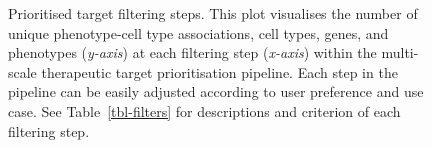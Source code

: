 \documentclass[
]{agujournal2019}
\begin{document}
\newpage{}

\label{cell-fig-therapy-filter}
\begin{figure}[H]


\caption{\label{fig-therapy-filter}Prioritised target filtering steps.
This plot visualises the number of unique phenotype-cell type
associations, cell types, genes, and phenotypes (\emph{y-axis}) at each
filtering step (\emph{x-axis}) within the multi-scale therapeutic target
prioritisation pipeline. Each step in the pipeline can be easily
adjusted according to user preference and use case. See
Table~\ref{tbl-filters} for descriptions and criterion of each filtering
step.}

\end{figure}%

\newpage{}
\end{document}
